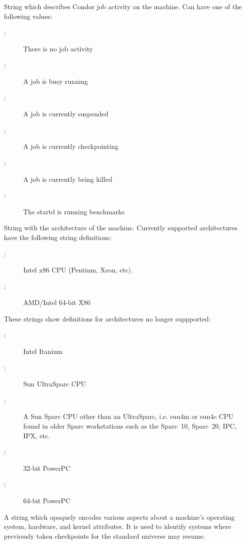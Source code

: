 \begin{description}
%
\item[\AdAttr{Activity}:] String which describes Condor job activity on the machine.
Can have one of the following values:
	\begin{description}
	\item[:] There is no job activity
	\item[:] A job is busy running
	\item[:] A job is currently suspended
	\item[:] A job is currently checkpointing
	\item[:] A job is currently being killed
	\item[:] The startd is running benchmarks
	\end{description}
%
\item[\AdAttr{Arch}:] String with the architecture of the machine.  
Currently supported architectures have the following string
definitions:
	\begin{description}
	\item[:] Intel x86 CPU (Pentium, Xeon, etc).
	\item[:] AMD/Intel 64-bit X86
	\end{description}
These strings show definitions for architectures no longer suppported:
	\begin{description}
	\item[:] Intel Itanium
	\item[:] Sun UltraSparc CPU
	\item[:] A Sun Sparc CPU other than an UltraSparc, i.e.
sun4m or sun4c CPU found in older Sparc workstations such as the Sparc~10, 
Sparc~20, IPC, IPX, etc.
	\item[:] 32-bit PowerPC
	\item[:] 64-bit PowerPC
	\end{description}
%
\item[\AdAttr{CheckpointPlatform}:] A string which opaquely encodes various
aspects about a machine's operating system, hardware, and kernel
attributes.
It is used to identify systems where previously taken checkpoints for
the standard universe may resume.
%

\end{description}

